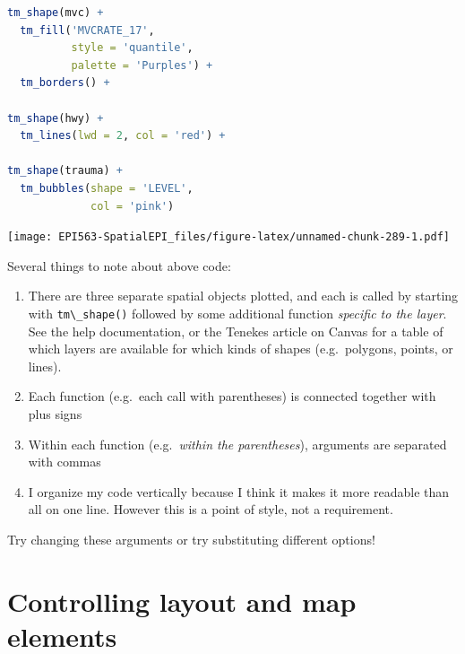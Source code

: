 \documentclass[
]{book}
\newcommand{\passthrough}[1]{#1}
\providecommand{\tightlist}{%
  \setlength{\itemsep}{0pt}\setlength{\parskip}{0pt}}
\begin{document}
\begin{lstlisting}[language=R]
tm_shape(mvc) + 
  tm_fill('MVCRATE_17',
          style = 'quantile',
          palette = 'Purples') +
  tm_borders() +

tm_shape(hwy) + 
  tm_lines(lwd = 2, col = 'red') +
  
tm_shape(trauma) + 
  tm_bubbles(shape = 'LEVEL',
             col = 'pink')
\end{lstlisting}

\texttt{[image: EPI563-SpatialEPI\_files/figure-latex/unnamed-chunk-289-1.pdf]}

Several things to note about above code:

\begin{enumerate}
\def\labelenumi{\arabic{enumi}.}
\tightlist
\item
  There are three separate spatial objects plotted, and each is called by starting with \passthrough{\lstinline!tm\_shape()!} followed by some additional function \emph{specific to the layer}. See the help documentation, or the Tenekes article on Canvas for a table of which layers are available for which kinds of shapes (e.g.~polygons, points, or lines).
\item
  Each function (e.g.~each call with parentheses) is connected together with plus signs
\item
  Within each function (e.g.~\emph{within the parentheses}), arguments are separated with commas
\item
  I organize my code vertically because I think it makes it more readable than all on one line. However this is a point of style, not a requirement.
\end{enumerate}

Try changing these arguments or try substituting different options!

\hypertarget{controlling-layout-and-map-elements}{%
\section{Controlling layout and map elements}\label{controlling-layout-and-map-elements}}
\end{document}
